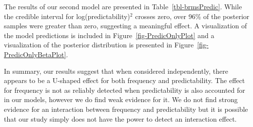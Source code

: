 \documentclass[
  12pt,
  letterpaper,
]{scrreprt}
\begin{document}
The results of our second model are presented in
Table~\ref{tbl-brmsPredic}. While the credible interval for
log(predictability)\(^2\) crosses zero, over 96\% of the posterior
samples were greater than zero, suggesting a meaningful effect. A
visualization of the model predictions is included in
Figure~\ref{fig-PredicOnlyPlot} and a visualization of the posterior
distribution is presented in Figure~\ref{fig-PredicOnlyBetaPlot}.

In summary, our results suggest that when considered independently,
there appears to be a U-shaped effect for both frequency and
predictability. The effect for frequency is not as reliably detected
when predictability is also accounted for in our models, however we do
find weak evidence for it. We do not find strong evidence for an
interaction between frequency and predictability but it is possible that
our study simply does not have the power to detect an interaction
effect.

\begin{table}

\caption{\label{tbl-gamModelTab}Model results for the generalized
Additive Mixed Model cotanining only the interaction between frequency
and predictability.}


\end{table}%
\end{document}
